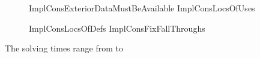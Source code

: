 %
\let\oldthefigure\thefigure
\renewcommand{\thefigure}{\oldthefigure{} (cont.)}
%
\begin{figure}
  \ContinuedFloat
  \centering

                      {ImplConsExteriorDataMustBeAvailable}%
  \hfill%
                      {ImplConsLocsOfUses}

  \vspace{\betweensubfigures}

                      {ImplConsLocsOfDefs}%
  \hfill%
                      {ImplConsFixFallThroughs}

  \mkFigureCaption*
\end{figure}
%
\renewcommand{\thefigure}{\oldthefigure}
%
The solving times range from
\printMinSolvingTime{
  \SolvTechDisableImplConsDefsDominateDefsPrePlusSolvingTimeSpeedupAllPrePlusSolvingTimeAvgMin,
  \SolvTechDisableImplConsDefsDominateDefsPrePlusSolvingTimeSpeedupPrePlusSolvingTimeAvgMin,
  \SolvTechDisableImplConsDefsInSpannedBlocksPrePlusSolvingTimeSpeedupPrePlusSolvingTimeAvgMin,
  \SolvTechDisableImplConsIdenticalEntryBlocksPrePlusSolvingTimeSpeedupPrePlusSolvingTimeAvgMin,
  \SolvTechDisableImplConsDefsDominateEntryBlocksPrePlusSolvingTimeSpeedupPrePlusSolvingTimeAvgMin,
  \SolvTechDisableImplConsPlacePhiOpsSameAsDefEdgesPrePlusSolvingTimeSpeedupPrePlusSolvingTimeAvgMin,
  \SolvTechDisableImplConsNoSpanUsesPrePlusSolvingTimeSpeedupPrePlusSolvingTimeAvgMin,
  \SolvTechDisableImplConsNoSpanDefsPrePlusSolvingTimeSpeedupPrePlusSolvingTimeAvgMin,
  \SolvTechDisableImplConsNoSpanUseDefsPrePlusSolvingTimeSpeedupPrePlusSolvingTimeAvgMin,
  \SolvTechDisableImplConsSpannedInputPrePlusSolvingTimeSpeedupPrePlusSolvingTimeAvgMin,
  \SolvTechDisableImplConsUsedDataMustBeAvailablePrePlusSolvingTimeSpeedupPrePlusSolvingTimeAvgMin,
  \SolvTechDisableImplConsExteriorDataMustBeAvailablePrePlusSolvingTimeSpeedupPrePlusSolvingTimeAvgMin,
  \SolvTechDisableImplConsLocsOfUsesPrePlusSolvingTimeSpeedupPrePlusSolvingTimeAvgMin,
  \SolvTechDisableImplConsLocsOfDefsPrePlusSolvingTimeSpeedupPrePlusSolvingTimeAvgMin,
  \SolvTechDisableImplConsFixFallThroughsPrePlusSolvingTimeSpeedupPrePlusSolvingTimeAvgMin
} to
